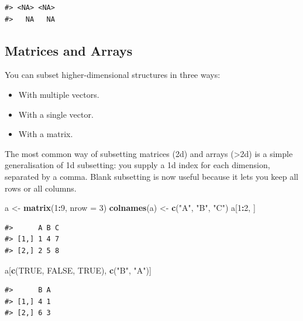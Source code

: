 \documentclass[]{book}
\newenvironment{Shaded}{\begin{snugshade}}{\end{snugshade}}
\newcommand{\KeywordTok}[1]{\textcolor[rgb]{0.13,0.29,0.53}{\textbf{#1}}}
\newcommand{\DataTypeTok}[1]{\textcolor[rgb]{0.13,0.29,0.53}{#1}}
\newcommand{\DecValTok}[1]{\textcolor[rgb]{0.00,0.00,0.81}{#1}}
\newcommand{\StringTok}[1]{\textcolor[rgb]{0.31,0.60,0.02}{#1}}
\newcommand{\OtherTok}[1]{\textcolor[rgb]{0.56,0.35,0.01}{#1}}
\newcommand{\OperatorTok}[1]{\textcolor[rgb]{0.81,0.36,0.00}{\textbf{#1}}}
\newcommand{\NormalTok}[1]{#1}
\providecommand{\tightlist}{%
  \setlength{\itemsep}{0pt}\setlength{\parskip}{0pt}}
\theoremstyle{definition}
\theoremstyle{definition}
\theoremstyle{definition}
\theoremstyle{remark}
\begin{document}
\begin{verbatim}
#> <NA> <NA> 
#>   NA   NA
\end{verbatim}

\subsection{Matrices and Arrays}\label{matrices-and-arrays-1}

You can subset higher-dimensional structures in three ways:

\begin{itemize}
\tightlist
\item
  With multiple vectors.
\item
  With a single vector.
\item
  With a matrix.
\end{itemize}

The most common way of subsetting matrices (2d) and arrays
(\textgreater{}2d) is a simple generalisation of 1d subsetting: you
supply a 1d index for each dimension, separated by a comma. Blank
subsetting is now useful because it lets you keep all rows or all
columns.

\begin{Shaded}
\begin{Highlighting}[]
\NormalTok{a <-}\StringTok{ }\KeywordTok{matrix}\NormalTok{(}\DecValTok{1}\OperatorTok{:}\DecValTok{9}\NormalTok{, }\DataTypeTok{nrow =} \DecValTok{3}\NormalTok{)}
\KeywordTok{colnames}\NormalTok{(a) <-}\StringTok{ }\KeywordTok{c}\NormalTok{(}\StringTok{"A"}\NormalTok{, }\StringTok{"B"}\NormalTok{, }\StringTok{"C"}\NormalTok{)}
\NormalTok{a[}\DecValTok{1}\OperatorTok{:}\DecValTok{2}\NormalTok{, ]}
\end{Highlighting}
\end{Shaded}

\begin{verbatim}
#>      A B C
#> [1,] 1 4 7
#> [2,] 2 5 8
\end{verbatim}

\begin{Shaded}
\begin{Highlighting}[]
\NormalTok{a[}\KeywordTok{c}\NormalTok{(}\OtherTok{TRUE}\NormalTok{, }\OtherTok{FALSE}\NormalTok{, }\OtherTok{TRUE}\NormalTok{), }\KeywordTok{c}\NormalTok{(}\StringTok{"B"}\NormalTok{, }\StringTok{"A"}\NormalTok{)]}
\end{Highlighting}
\end{Shaded}

\begin{verbatim}
#>      B A
#> [1,] 4 1
#> [2,] 6 3
\end{verbatim}
\end{document}
